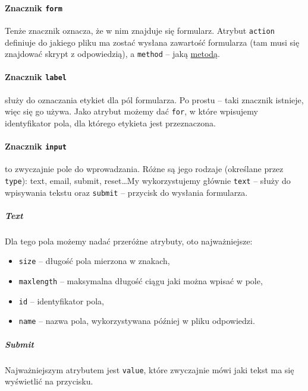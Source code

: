 \documentclass [a4paper, 10pt, oneside]{article}
\begin{document}
\paragraph{Znacznik \texttt{form}} Tenże znacznik oznacza, że w nim znajduje się formularz. Atrybut \texttt{action} definiuje do jakiego pliku ma zostać wysłana zawartość formularza (tam musi się znajdować skrypt z odpowiedzią), a \texttt{method} -- jaką \hyperlink{metody}{metodą}.
\paragraph{Znacznik \texttt{label}} służy do oznaczania etykiet dla pól formularza. Po prostu -- taki znacznik istnieje, więc się go używa. Jako atrybut możemy dać \texttt{for}, w które wpisujemy identyfikator pola, dla którego etykieta jest przeznaczona.
\paragraph{Znacznik \texttt{input}} to zwyczajnie pole do wprowadzania. Różne są jego rodzaje (określane przez \texttt{type}): text, email, submit, reset\dots My wykorzystujemy głównie \texttt{text} -- służy do wpisywania tekstu oraz \texttt{submit} -- przycisk do wysłania formularza.

\subparagraph{Text} Dla tego pola możemy nadać przeróżne atrybuty, oto najważniejsze:
\begin{itemize}
    \item \texttt{size} -- długość pola mierzona w znakach,
    \item \texttt{maxlength} -- maksymalna długość ciągu jaki można wpisać w pole,
    \item \texttt{id} -- identyfikator pola,
    \item \texttt{name} -- nazwa pola, wykorzystywana później w pliku odpowiedzi.
\end{itemize}

\subparagraph{Submit} Najważniejszym atrybutem jest \texttt{value}, które zwyczajnie mówi jaki tekst ma się wyświetlić na przycisku.
\end{document}
